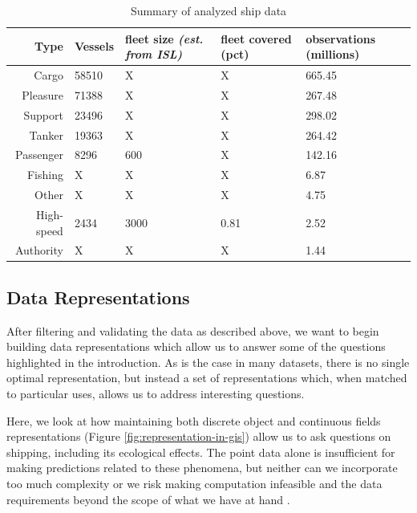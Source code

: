 \begin{table}[htbp]
  \begin{tabular}{rllll} %
    \hline
    Type & Vessels & fleet size \textit{(est. from ISL)} & fleet covered (pct) & observations (millions) \\
    \hline
    Cargo & 58510 & X & X & 665.45 \\
    Pleasure & 71388 & X & X & 267.48 \\
    Support & 23496 & X & X & 298.02 \\
    Tanker & 19363 & X & X & 264.42 \\
    Passenger & 8296 & 600 & X & 142.16 \\
    Fishing & X & X & X & 6.87 \\
    Other & X & X & X & 4.75 \\
    High-speed & 2434 & 3000 & 0.81 & 2.52 \\
    Authority & X & X & X & 1.44 \\
  \end{tabular}
  \caption{Summary of analyzed ship data}
  \label{table:ships-by-type}
\end{table}


\subsection{Data Representations}


After filtering and validating the data as described above, we want to begin building data representations which allow us to answer some of the questions highlighted in the introduction. As is the case in many datasets, there is no single optimal representation, but instead a set of representations which, when matched to particular uses, allows us to address interesting questions.

Here, we look at how maintaining both discrete object and continuous fields representations (Figure \ref{fig:representation-in-gis}) allow us to ask questions on shipping, including its ecological effects. The point data alone is insufficient for making predictions related to these phenomena, but neither can we incorporate too much complexity or we risk making computation infeasible and the data requirements beyond the scope of what we have at hand \citep{de2007geospatial}.


